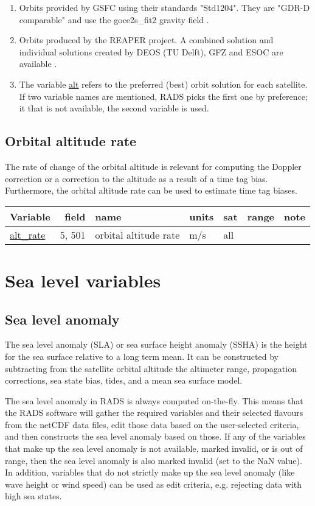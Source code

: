 \documentclass[a4paper,11pt,openany,natbib]{thesis}
\makeatletter
\newcommand\var[1]{\url{#1}\index{variables!#1@\protect\url{#1}}}
\newenvironment{vartable}{
\begin{table}[ht]
\small
\begin{tabular}{lrllllr}
\hline
Variable & field & name & units & sat & range & note \\
\hline
}{
\hline
\end{tabular}
\end{table}
}
\makeatother
\begin{document}
\begin{enumerate}
\item Orbits provided by GSFC using their standards "Std1204". They are "GDR-D comparable" and use the goce2s\_fit2 gravity field \citep{lemoine2013}.\label{item:alt_std1204}
\item Orbits produced by the REAPER project. A combined solution and individual solutions created by DEOS (TU Delft), GFZ and ESOC are available \citep{rudenko2011}.\label{item:alt_reaper}
\item The variable \var{alt} refers to the preferred (best) orbit solution for each satellite. If two variable names are mentioned, RADS picks the first one by preference; it that is not available, the second variable is used.\label{item:alt}
\end{enumerate}

\section{Orbital altitude rate}
The rate of change of the orbital altitude is relevant for computing the Doppler correction or a correction to the altitude as a result of a time tag bias. Furthermore, the orbital altitude rate can be used to estimate time tag biases.

\begin{vartable}
\var{alt_rate} & 5, 501 & orbital altitude rate & m/s & all && \\
\end{vartable}

\chapter{Sea level variables}
\section{Sea level anomaly}
\label{var:sla}
The sea level anomaly (SLA) or sea surface height anomaly (SSHA) is the height for the sea surface relative to a long term mean. It can be constructed by subtracting from the satellite orbital altitude the altimeter range, propagation corrections, sea state bias, tides, and a mean sea surface model. 

The sea level anomaly in RADS is always computed on-the-fly. This means that the RADS software will gather the required variables and their selected flavours from the netCDF data files, edit those data based on the user-selected criteria, and then constructs the sea level anomaly based on those. If any of the variables that make up the sea level anomaly is not available, marked invalid, or is out of range, then the sea level anomaly is also marked invalid (set to the NaN value). In addition, variables that do not strictly make up the sea level anomaly (like wave height or wind speed) can be used as edit criteria, e.g. rejecting data with high sea states.
\end{document}
